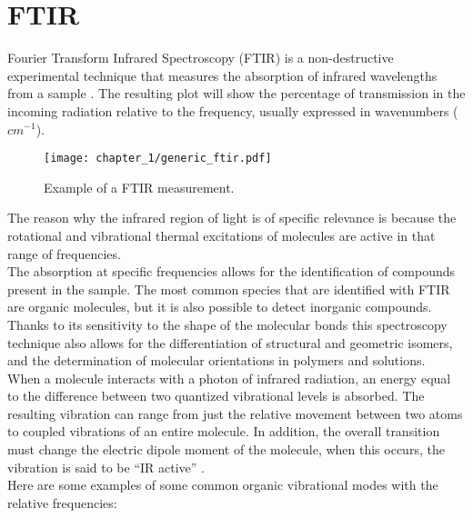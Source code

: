 \section{FTIR}
\label{sec:ftir}

Fourier Transform Infrared Spectroscopy (FTIR) is a non-destructive experimental technique that measures the absorption of infrared wavelengths from a sample \cite{gaffneyFourierTransformInfrared2012}. The resulting plot will show the percentage of transmission in the incoming radiation relative to the frequency, usually expressed in wavenumbers ($cm^{-1}$). 
\vspace*{-30pt}
\begin{figure}[H]
    \centering
    \texttt{[image: chapter\_1/generic\_ftir.pdf]}
    \vspace*{-30pt}
    \caption{Example of a FTIR measurement.}
    \label{fig:generic_spectrum_ftir}
\end{figure}
The reason why the infrared region of light is of specific relevance is because the rotational and vibrational thermal excitations of molecules are active in that range of frequencies.
\\
The absorption at specific frequencies allows for the identification of compounds present in the sample. The most common species that are identified with FTIR are organic molecules, but it is also possible to detect inorganic compounds. Thanks to its sensitivity to the shape of the molecular bonds this spectroscopy technique also allows for the differentiation of structural and geometric isomers, and the determination of molecular orientations in polymers and solutions.
\\
When a molecule interacts with a photon of infrared radiation, an energy equal to the difference between two quantized vibrational levels is absorbed. The resulting vibration can range from just the relative movement between two atoms to coupled vibrations of an entire molecule. In addition, the overall transition must change the electric dipole moment of the molecule, when this occurs, the vibration is said to be “IR active” \cite{gaffneyFourierTransformInfrared2012}.
\\
Here are some examples of some common organic vibrational modes with the relative frequencies:

